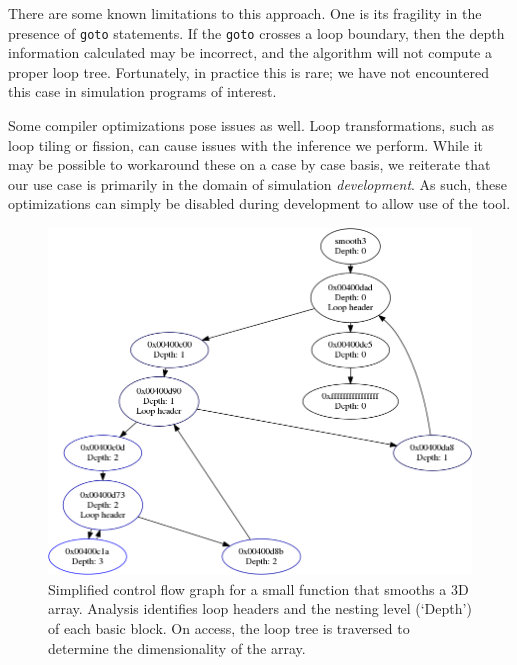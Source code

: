 There are some known limitations to this approach.  One is its
fragility in the presence of
\texttt{goto} statements.  If the \texttt{goto} crosses a loop
boundary, then the depth information calculated may be incorrect, and
the algorithm will not compute a proper loop tree.  Fortunately, in
practice this is rare; we have not encountered this case in simulation
programs of interest.

Some compiler optimizations pose issues as well.  Loop transformations,
such as loop tiling or fission, can cause issues with the inference we
perform.  While it may be possible to workaround these on a case by
case basis, we reiterate that our use case is primarily in the domain
of simulation \emph{development}.  As such, these optimizations can
simply be disabled during development to allow use of the tool.

\begin{figure}
  \centering
  \includegraphics[width=\linewidth]{images/dbg/s3}

  \caption{Simplified control flow graph for a small function that
  smooths a 3D array.  Analysis identifies loop headers and the nesting
  level (`Depth') of each basic block.  On access, the loop tree is
  traversed to determine the dimensionality of the array.}

  \label{fig:cfg}
\end{figure}


